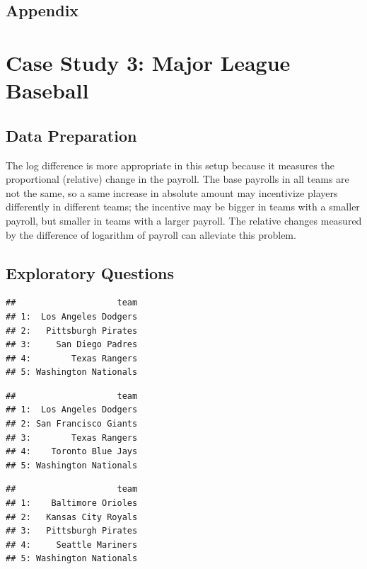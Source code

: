 \documentclass[
  12pt,
]{article}
\begin{document}
\hypertarget{appendix}{%
\subsection{Appendix}\label{appendix}}

\hypertarget{case-study-3-major-league-baseball}{%
\section{Case Study 3: Major League
Baseball}\label{case-study-3-major-league-baseball}}

\hypertarget{data-preparation-2}{%
\subsection{Data Preparation}\label{data-preparation-2}}

The log difference is more appropriate in this setup because it measures
the proportional (relative) change in the payroll. The base payrolls in
all teams are not the same, so a same increase in absolute amount may
incentivize players differently in different teams; the incentive may be
bigger in teams with a smaller payroll, but smaller in teams with a
larger payroll. The relative changes measured by the difference of
logarithm of payroll can alleviate this problem.

\hypertarget{exploratory-questions}{%
\subsection{Exploratory Questions}\label{exploratory-questions}}

\begin{verbatim}
##                    team
## 1:  Los Angeles Dodgers
## 2:   Pittsburgh Pirates
## 3:     San Diego Padres
## 4:        Texas Rangers
## 5: Washington Nationals
\end{verbatim}

\begin{verbatim}
##                    team
## 1:  Los Angeles Dodgers
## 2: San Francisco Giants
## 3:        Texas Rangers
## 4:    Toronto Blue Jays
## 5: Washington Nationals
\end{verbatim}

\begin{verbatim}
##                    team
## 1:    Baltimore Orioles
## 2:   Kansas City Royals
## 3:   Pittsburgh Pirates
## 4:     Seattle Mariners
## 5: Washington Nationals
\end{verbatim}
\end{document}

